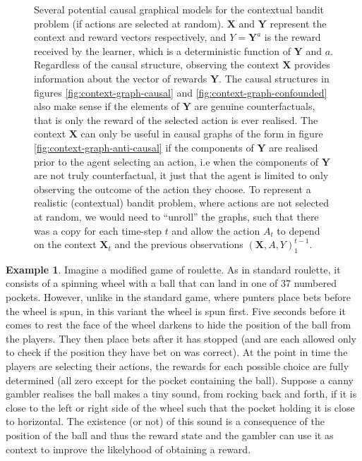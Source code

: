 \documentclass[11pt,a4paper,oneside]{book}
\renewcommand{\vec}[1]{\boldsymbol{#1}}
\newcommand{\quotes}[1]{``#1''}
\theoremstyle{plain}
\theoremstyle{definition}
\newtheorem{example}[theorem]{Example}
\begin{document}
\begin{figure}[h]
\caption{Several potential causal graphical models for the contextual bandit problem (if actions are selected at random). $\vec{X}$ and $\vec{Y}$ represent the context and reward vectors respectively, and $Y = \vec{Y}^a$ is the reward received by the learner, which is a deterministic function of $\vec{Y}$ and $a$. Regardless of the causal structure, observing the context $\vec{X}$ provides information about the vector of rewards $\vec{Y}$. The causal structures in figures \ref{fig:context-graph-causal} and \ref{fig:context-graph-confounded} also make sense if the elements of $\vec{Y}$ are genuine counterfactuals, that is only the reward of the selected action is ever realised. The context $\vec{X}$ can only be useful in causal graphs of the form in figure \ref{fig:context-graph-anti-causal} if the components of $\vec{Y}$ are realised prior to the agent selecting an action, i.e when the components of $\vec{Y}$ are not truly counterfactual, it just that the agent is limited to only observing the outcome of the action they choose.  To represent a realistic (contextual) bandit problem, where actions are not selected at random, we would need to \quotes{unroll} the graphs, such that there was a copy for each time-step $t$ and allow the action $A_t$ to depend on the context $\vec{X}_t$ and the previous observations $(\vec{X},A,Y)_1^{t-1}$. }
\label{fig:contextual-bandit-causal-graph}
\end{figure}

\vspace{0.5cm}
\begin{example}
\label{exm:anti-casual-context}
Imagine a modified game of roulette. As in standard roulette, it consists of a spinning wheel with a ball that can land in one of 37 numbered pockets. However, unlike in the standard game, where punters place bets before the wheel is spun, in this variant the wheel is spun first. Five seconds before it comes to rest the face of the wheel darkens to hide the position of the ball from the players. They then place bets after it has stopped (and are each allowed only to check if the position they have bet on was correct). At the point in time the players are selecting their actions, the rewards for each possible choice are fully determined (all zero except for the pocket containing the ball). Suppose a canny gambler realises the ball makes a tiny sound, from rocking back and forth, if it is close to the left or right side of the wheel such that the pocket holding it is close to horizontal. The existence (or not) of this sound is a consequence of the position of the ball and thus the reward state and the gambler can use it as context to improve the likelyhood of obtaining a reward.
\end{example}
\end{document}
